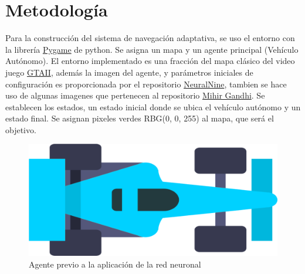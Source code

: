 \documentclass[conference]{IEEEtran}
\begin{document}

\section{Metodología}
Para la construcción del sistema de navegación adaptativa, se uso el entorno con la librería \href{https://www.pygame.org/wiki/GettingStarted}{Pygame} de python. Se asigna un mapa y un agente principal (Vehículo Autónomo). El entorno implementado es una fracción del mapa clásico del video juego \href{https://www.rockstargames.com/games/gta2}{GTAII}, además la imagen del agente, y parámetros iniciales de configuración es proporcionada por el repositorio \href{https://github.com/NeuralNine/ai-car-simulation}{NeuralNine}, tambien se hace uso de algunas imagenes que pertenecen al repositorio \href{https://github.com/mihir-m-gandhi/Traffic-Intersection-Simulation-with-Stats}{Mihir Gandhi}.
Se establecen los estados, un estado inicial donde se ubica el vehículo autónomo y un estado final. Se asignan pixeles verdes RBG(0, 0, 255) al mapa, que será el objetivo.
\begin{figure}[H]
    \centering    \includegraphics[width=0.5\linewidth]{images/car.png}
    \caption{Agente previo a la aplicación de la red neuronal}
    \label{fig:agente}
\end{figure}
\end{document}
